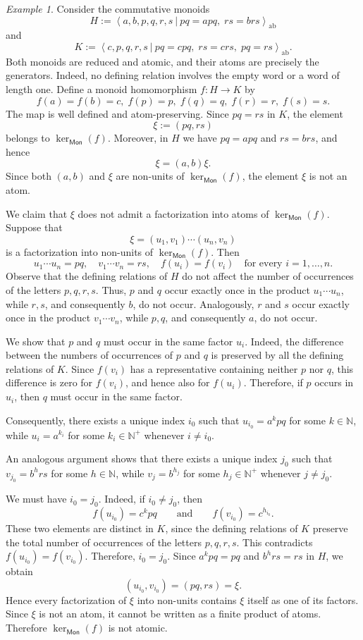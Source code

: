 \documentclass[a4paper,10pt,reqno]{amsart}
\theoremstyle{definition}
\theoremstyle{remark}
\newtheorem{example}[theorem]{Example}
\newcommand{\Mon}{\mathsf{Mon}}
\begin{document}
\begin{example}\label{ex:non-atomic-monoid-kernel}
Consider the commutative monoids
$$
H:=
\left\langle
a,b,p,q,r,s
\ |\
pq=apq,\; rs=brs
\right\rangle_{\mathrm{ab}}
$$
and
$$
K:=
\left\langle
c,p,q,r,s
\ |\
pq=cpq,\; rs=crs,\; pq=rs
\right\rangle_{\mathrm{ab}}.
$$
Both monoids are reduced and atomic, and their atoms are precisely the generators. Indeed, no defining relation involves the empty word or a word of length one. Define a monoid homomorphism $f:H\to K$ by
$$
f(a)=f(b)=c,\; f(p)=p,\; f(q)=q,\; f(r)=r,\; f(s)=s.
$$
The map is well defined and atom-preserving. Since $pq=rs$ in $K$, the element
$$
\xi:=(pq,rs)
$$
belongs to $\ker_{\Mon}(f)$. Moreover, in $H$ we have $pq=apq$ and $rs=brs$, and hence
$$
\xi=(a,b)\xi.
$$
Since both $(a,b)$ and $\xi$ are non-units of $\ker_{\Mon}(f)$,
the element $\xi$ is not an atom.

We claim that $\xi$ does not admit a factorization into atoms of
$\ker_{\Mon}(f)$. Suppose that
$$
\xi=(u_1,v_1)\cdots(u_n,v_n)
$$
is a factorization into non-units of $\ker_{\Mon}(f)$. Then
$$
u_1\cdots u_n=pq,
\quad
v_1\cdots v_n=rs,
\quad
f(u_i)=f(v_i)
\quad\text{for every }i=1,\ldots,n.
$$
Observe that the defining relations of $H$ do not affect the number
of occurrences of the letters $p,q,r,s$. Thus, $p$ and $q$ occur
exactly once in the product $u_1\cdots u_n$, while $r,s$, and
consequently $b$, do not occur. Analogously, $r$ and $s$ occur
exactly once in the product $v_1\cdots v_n$, while $p,q$, and
consequently $a$, do not occur.

We show that $p$ and $q$ must occur in the same factor $u_i$. Indeed, the difference between the numbers of occurrences of $p$ and $q$ is preserved by all the defining relations of $K$. Since $f(v_i)$ has a representative containing neither $p$ nor $q$, this difference is zero for $f(v_i)$, and hence also for $f(u_i)$. Therefore, if $p$ occurs in $u_i$, then $q$ must occur in the same factor.

Consequently, there exists a unique index $i_0$ such that $u_{i_0}=a^kpq$ for some $k\in\mathbb N$, while $u_i=a^{k_i}$ for some $k_i\in\mathbb N^+$ whenever $i\neq i_0$.

An analogous argument shows that there exists a unique index $j_0$ such that $v_{j_0}=b^hrs$ for some $h\in\mathbb N$, while $v_j=b^{h_j}$ for some $h_j\in\mathbb N^+$ whenever $j\neq j_0$.

We must have $i_0=j_0$. Indeed, if $i_0\neq j_0$, then
$$
f(u_{i_0})=c^kpq
\qquad\text{and}\qquad
f(v_{i_0})=c^{h_{i_0}}.
$$
These two elements are distinct in $K$, since the defining relations
of $K$ preserve the total number of occurrences of the letters
$p,q,r,s$. This contradicts $f(u_{i_0})=f(v_{i_0})$. Therefore, $i_0=j_0$. Since $a^kpq=pq$ and $b^hrs=rs$ in $H$, we obtain
$$
(u_{i_0},v_{i_0})=(pq,rs)=\xi.
$$
Hence every factorization of $\xi$ into non-units contains $\xi$
itself as one of its factors. Since $\xi$ is not an atom, it cannot
be written as a finite product of atoms. Therefore
$\ker_{\Mon}(f)$ is not atomic.
\end{example}
\end{document}
